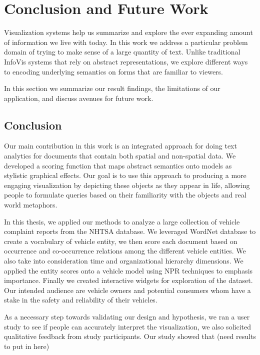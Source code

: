%
\chapter{Conclusion and Future Work}
Visualization systems help us summarize and explore the ever expanding amount of
information we live with today. In this work we address a particular problem
domain of trying to make sense of a large quantity of text. Unlike traditional
InfoVis systems that rely on abstract representations, we explore different ways
to encoding underlying semantics on forms that are familiar to viewers. 

In this section we summarize our result findings, the limitations of our
application, and discuss avenues for future work.

\section{Conclusion}
Our main contribution in this work is an integrated approach for doing text
analytics for documents that contain both spatial and non-spatial data. We
developed a scoring function that maps abstract semantics onto \threed models as
stylistic graphical effects. Our goal is to use this approach to producing a
more engaging visualization by depicting these objects as they appear in life,
allowing people to formulate queries based on their familiarity with the objects
and real world metaphors.

In this thesis, we applied our methods to analyze a large collection of vehicle
complaint reports from the NHTSA database. We leveraged WordNet database to
create a vocabulary of vehicle entity, we then score each document based on
occurrence and co-occurrence relations among the different vehicle entities.
We also take into consideration time and organizational hierarchy dimensions. We
applied the entity scores onto a \threed vehicle model using NPR techniques to
emphasis importance. Finally we created interactive widgets for exploration of
the dataset. Our intended audience are vehicle owners and potential consumers
whom have a stake in the safety and reliability of their vehicles.


As a necessary step towards validating our design and hypothesis, we ran a user
study to see if people can accurately interpret the visualization, we also
solicited qualitative feedback from study participants. Our study showed that
(need results to put in here)


